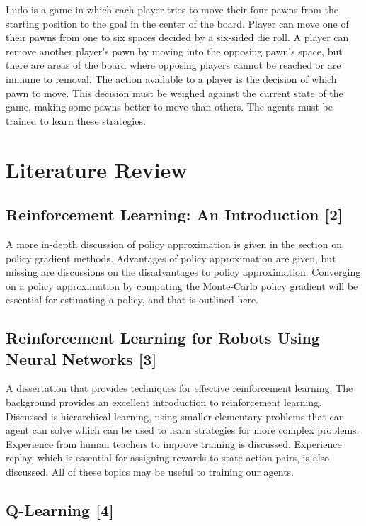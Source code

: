 \documentclass[conference]{IEEEtran}
\begin{document}
Ludo is a game in which each player tries to move their four pawns from the
starting position to the goal in the center of the board. Player can move one
of their pawns from one to six spaces decided by a six-sided die roll. A
player can remove another player's pawn by moving into the opposing pawn's
space, but there are areas of the board where opposing players cannot be
reached or are immune to removal. The action available to a player is the
decision of which pawn to move. This decision must be weighed against the
current state of the game, making some pawns better to move than others. The
agents must be trained to learn these strategies.

\section{Literature Review}

\subsection{Reinforcement Learning: An Introduction [2]}

A more in-depth discussion of policy approximation is given in the section on
policy gradient methods. Advantages of policy approximation are given, but
missing are discussions on the disadvantages to policy approximation.
Converging on a policy approximation by computing the Monte-Carlo policy
gradient will be essential for estimating a policy, and that is outlined here.

\subsection{Reinforcement Learning for Robots Using Neural Networks [3]}

A dissertation that provides techniques for effective reinforcement learning.
The background provides an excellent introduction to reinforcement learning.
Discussed is hierarchical learning, using smaller elementary problems that can
agent can solve which can be used to learn strategies for more complex
problems. Experience from human teachers to improve training is discussed.
Experience replay, which is essential for assigning rewards to state-action
pairs, is also discussed. All of these topics may be useful to training our
agents.

\subsection{Q-Learning [4]}
\end{document}
